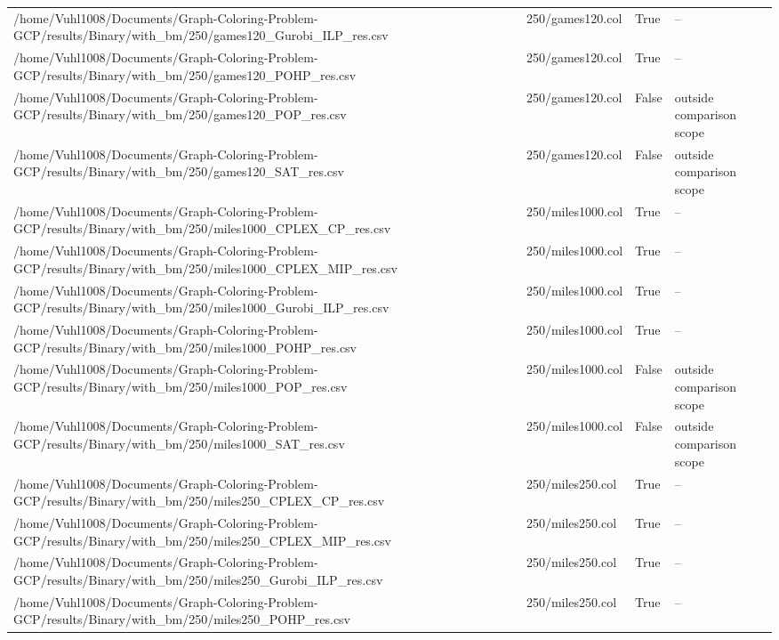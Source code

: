 \begin{table}[htbp]
\begin{tabular}{llll}
/home/Vuhl1008/Documents/Graph-Coloring-Problem-GCP/results/Binary/with\_bm/250/games120\_Gurobi\_ILP\_res.csv & 250/games120.col & True & -- \\
/home/Vuhl1008/Documents/Graph-Coloring-Problem-GCP/results/Binary/with\_bm/250/games120\_POHP\_res.csv & 250/games120.col & True & -- \\
/home/Vuhl1008/Documents/Graph-Coloring-Problem-GCP/results/Binary/with\_bm/250/games120\_POP\_res.csv & 250/games120.col & False & outside comparison scope \\
/home/Vuhl1008/Documents/Graph-Coloring-Problem-GCP/results/Binary/with\_bm/250/games120\_SAT\_res.csv & 250/games120.col & False & outside comparison scope \\
/home/Vuhl1008/Documents/Graph-Coloring-Problem-GCP/results/Binary/with\_bm/250/miles1000\_CPLEX\_CP\_res.csv & 250/miles1000.col & True & -- \\
/home/Vuhl1008/Documents/Graph-Coloring-Problem-GCP/results/Binary/with\_bm/250/miles1000\_CPLEX\_MIP\_res.csv & 250/miles1000.col & True & -- \\
/home/Vuhl1008/Documents/Graph-Coloring-Problem-GCP/results/Binary/with\_bm/250/miles1000\_Gurobi\_ILP\_res.csv & 250/miles1000.col & True & -- \\
/home/Vuhl1008/Documents/Graph-Coloring-Problem-GCP/results/Binary/with\_bm/250/miles1000\_POHP\_res.csv & 250/miles1000.col & True & -- \\
/home/Vuhl1008/Documents/Graph-Coloring-Problem-GCP/results/Binary/with\_bm/250/miles1000\_POP\_res.csv & 250/miles1000.col & False & outside comparison scope \\
/home/Vuhl1008/Documents/Graph-Coloring-Problem-GCP/results/Binary/with\_bm/250/miles1000\_SAT\_res.csv & 250/miles1000.col & False & outside comparison scope \\
/home/Vuhl1008/Documents/Graph-Coloring-Problem-GCP/results/Binary/with\_bm/250/miles250\_CPLEX\_CP\_res.csv & 250/miles250.col & True & -- \\
/home/Vuhl1008/Documents/Graph-Coloring-Problem-GCP/results/Binary/with\_bm/250/miles250\_CPLEX\_MIP\_res.csv & 250/miles250.col & True & -- \\
/home/Vuhl1008/Documents/Graph-Coloring-Problem-GCP/results/Binary/with\_bm/250/miles250\_Gurobi\_ILP\_res.csv & 250/miles250.col & True & -- \\
/home/Vuhl1008/Documents/Graph-Coloring-Problem-GCP/results/Binary/with\_bm/250/miles250\_POHP\_res.csv & 250/miles250.col & True & -- \\

\end{tabular}
\end{table}
